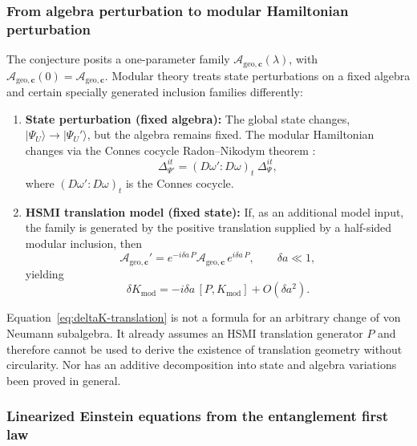 \documentclass[12pt,a4paper]{article}
\begin{document}
\subsubsection{From algebra perturbation to modular Hamiltonian perturbation}

The conjecture posits a one-parameter family $\mathcal{A}_{\mathrm{geo},\mathbf{c}}(\lambda)$, with $\mathcal{A}_{\mathrm{geo},\mathbf{c}}(0)=\mathcal{A}_{\mathrm{geo},\mathbf{c}}$.  Modular theory treats state perturbations on a fixed algebra and certain specially generated inclusion families differently:

\begin{enumerate}
\item[(a)] \textbf{State perturbation (fixed algebra):} The global state changes, $|\Psi_U\rangle \to |\Psi_U'\rangle$, but the algebra remains fixed.
The modular Hamiltonian changes via the Connes cocycle Radon--Nikodym theorem \cite{Connes1994, Takesaki2003}:
\begin{equation}
\Delta_{\Psi'}^{it} = (D\omega' : D\omega)_t \; \Delta_\Psi^{it},
\end{equation}
where $(D\omega' : D\omega)_t$ is the Connes cocycle.

\item[(b)] \textbf{HSMI translation model (fixed state):} If, as an additional model input, the family is generated by the positive translation supplied by a half-sided modular inclusion, then
\begin{equation}
\mathcal{A}_{\mathrm{geo},\mathbf{c}}' = e^{-i\delta a\, P} \mathcal{A}_{\mathrm{geo},\mathbf{c}}\, e^{i\delta a\, P}, \qquad \delta a \ll 1,
\end{equation}
yielding
\begin{equation}
\label{eq:deltaK-translation}
\delta K_{\mathrm{mod}} = -i\delta a\, [P, K_{\mathrm{mod}}] + O(\delta a^2).
\end{equation}
\end{enumerate}

Equation~\eqref{eq:deltaK-translation} is not a formula for an arbitrary change of von Neumann subalgebra.  It already assumes an HSMI translation generator $P$ and therefore cannot be used to derive the existence of translation geometry without circularity.  Nor has an additive decomposition into state and algebra variations been proved in general.

\subsubsection{Linearized Einstein equations from the entanglement first law}
\end{document}
